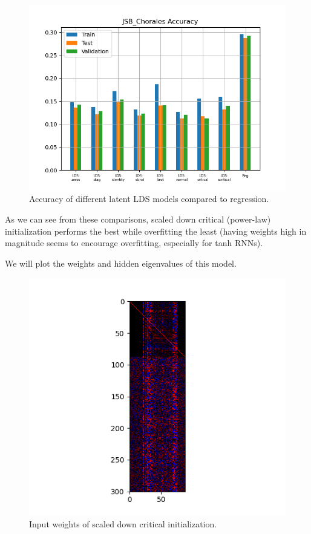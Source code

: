 \documentclass{article}
\begin{document}
\begin{figure}
    \centering
    \includegraphics{figures/jsb_lds_accs.png}
    \caption{Accuracy of different latent LDS models compared to regression.}
\end{figure}

As we can see from these comparisons, scaled down critical (power-law) initialization performs the best while overfitting the least (having weights high in magnitude seems to encourage overfitting, especially for tanh RNNs).

We will plot the weights and hidden eigenvalues of this model.

\begin{figure}
    \centering
    \includegraphics{figures/scrit_lds_in_weights.png}
    \caption{Input weights of scaled down critical initialization.}
\end{figure}
\end{document}
